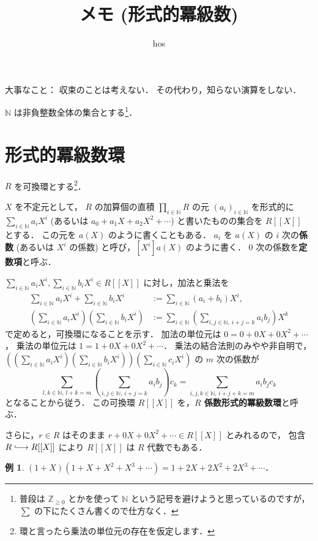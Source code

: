 \documentclass{jsarticle}
\title{メモ (形式的冪級数)}
\author{hos}
\newcommand{\N}{\mathbb{N}}
\newcommand{\Z}{\mathbb{Z}}
\theoremstyle{definition}
\newtheorem*{Exm}{例}
\newenvironment{exm}{\begin{leftbar}\begin{Exm}}{\end{Exm}\end{leftbar}}
\begin{document}
\maketitle

大事なこと：
収束のことは考えない．
その代わり，知らない演算をしない．

$\N$ は非負整数全体の集合とする\footnote{普段は $\Z_{\ge 0}$ とかを使って $\N$ という記号を避けようと思っているのですが，$\sum$ の下にたくさん書くので仕方なく．}．

\section{形式的冪級数環}
$R$ を可換環とする\footnote{環と言ったら乗法の単位元の存在を仮定します．}．

$X$ を不定元として，
$R$ の加算個の直積 $\prod_{i\in\N} R$ の元 $(a_i)_{i\in\N}$ を形式的に
$\sum_{i\in\N} a_i X^i$ (あるいは $a_0 + a_1 X + a_2 X^2 + \cdots$) と書いたものの集合を $R[[X]]$ とする．
この元を $a(X)$ のように書くこともある．
$a_i$ を $a(X)$ の $i$ 次の\textbf{係数} (あるいは $X^i$ の係数) と呼び，$[X^i] a(X)$ のように書く．
$0$ 次の係数を\textbf{定数項}と呼ぶ．

$\sum_{i\in\N} a_i X^i, \sum_{i\in\N} b_iX^i \in R[[X]]$ に対し，加法と乗法を
\begin{align*}
  \sum_{i\in\N} a_i X^i + \sum_{i\in\N} b_i X^i &:= \sum_{i\in\N} (a_i + b_i) X^i, \\
  \left(\sum_{i\in\N} a_i X^i\right) \left(\sum_{i\in\N} b_i X^i\right) &:= \sum_{i\in\N} \left(\sum_{i,j\in\N,\,i+j=k} a_i b_j\right) X^k
\end{align*}
で定めると，可換環になることを示す．
加法の単位元は $0 = 0 + 0 X + 0 X^2 + \cdots$，
乗法の単位元は $1 = 1 + 0 X + 0 X^2 + \cdots$．
乗法の結合法則のみやや非自明で，
$\left(\left(\sum_{i\in\N} a_i X^i\right) \left(\sum_{i\in\N} b_i X^i\right)\right) \left(\sum_{i\in\N} c_i X^i\right)$ の
$m$ 次の係数が
\[
  \sum_{l,k\in\N,\,l+k=m} \left(\sum_{i,j\in\N,\,i+j=k} a_i b_j\right) c_k = \sum_{i,j,k\in\N,\,i+j+k=m} a_i b_j c_k
\]
となることから従う．
この可換環 $R[[X]]$ を，\textbf{$R$ 係数形式的冪級数環}と呼ぶ．

さらに，$r \in R$ はそのまま $r + 0 X + 0 X^2 + \cdots \in R[[X]]$ とみれるので，
包含 $R \lhook\joinrel\longrightarrow R[[X]]$ により $R[[X]]$ は $R$ 代数でもある．

\begin{exm}
  $(1 + X) (1 + X + X^2 + X^3 + \cdots) = 1 + 2 X + 2 X^2 + 2 X^3 + \cdots$．
\end{exm}
\end{document}
